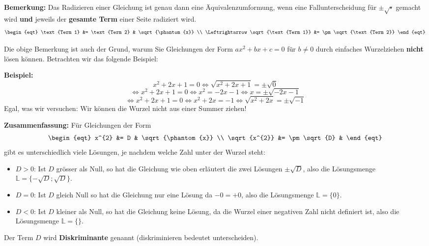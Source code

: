 \begin{note}
	\textbf{Bemerkung:} Das Radizieren einer Gleichung ist genau dann eine Äquivalenzumformung, wenn eine Fallunterscheidung für $\pm \sqrt{\square}$ gemacht wird \textbf{und} jeweils der \textbf{gesamte Term} einer Seite radiziert wird. 
	\[\begin{eqt}
		\text{Term 1} &= \text{Term 2}           & \sqrt{\phantom{x}} \\
	\Leftrightarrow	\sqrt{\text{Term 1}} &= \pm\sqrt{\text{Term 2}} 
	\end{eqt}\]
\end{note}

Die obige Bemerkung ist auch der Grund, warum Sie Gleichungen der Form $ax^2+bx+c=0$ für $b\neq0$ durch einfaches Wurzelziehen \textbf{nicht} lösen können. 
Betrachten wir das folgende Beispiel:
\begin{example}
	\textbf{Beispiel:}
	\[ x^2 + 2x +1 = 0 \Leftrightarrow \sqrt{ x^2 + 2x +1} = \pm \sqrt{0} \] 
	\[
	\Leftrightarrow x^2 + 2x +1 = 0 \Leftrightarrow x^2 = - 2x -1 \Leftrightarrow x=  \pm \sqrt{-2x-1} \]
	\[
	\Leftrightarrow x^2 + 2x +1 = 0 \Leftrightarrow x^2+2x = -1 \Leftrightarrow  \sqrt{x^2+2x}=  \pm \sqrt{-1}   \]
	Egal, was wir versuchen: Wir können die Wurzel nicht aus einer Summer ziehen!
\end{example}

\begin{note}
	\textbf{Zusammenfassung:}
	Für Gleichungen der Form
	\[\begin{eqt}
		x^{2} &= D           & \sqrt{\phantom{x}} \\
		\sqrt{x^{2}} &= \pm\sqrt{D} &
	\end{eqt}\]
	gibt es unterschiedlich viele Lösungen, je nachdem welche Zahl unter der Wurzel steht:
	\begin{itemize}
		\item $D>0$: Ist $D$ grösser als Null, so hat die Gleichung wie oben erläutert die zwei Lösungen $\pm \sqrt{D}$, also die Lösungsmenge $\mathbb{L} = \{-\sqrt{D};\sqrt{D}\}$.
		\item $D=0$: Ist $D$ gleich Null so hat die Gleichung nur eine Lösung da $-0 = +0$, also die Lösungsmenge $\mathbb{L} = \{0\}$.
		\item $D<0$: Ist $D$ kleiner als Null, so hat die Gleichung keine Lösung, da die Wurzel einer negativen Zahl nicht definiert ist, also die Lösungsmenge $\mathbb{L} = \{\}$.
	\end{itemize}
	Der Term $D$ wird \textbf{Diskriminante} genannt (diskriminieren bedeutet unterscheiden).
\end{note}


